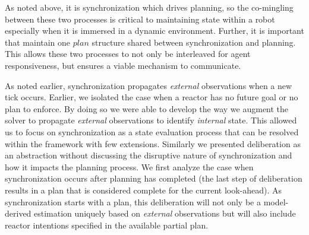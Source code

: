 As noted above, it is synchronization which drives planning, so the
co-mingling between these two processes is critical to maintaining
state within a robot especially when it is immersed in a dynamic
environment. Further, it is important that \rx maintain
one $plan$ structure shared between synchronization and planning. This
allows these two processes to not only be interleaved for agent
responsiveness, but ensures a viable mechanism to communicate.


As noted earlier, synchronization propagates {\em
  external} observations when a new tick occurs. Earlier, we isolated
the case when a reactor has no future goal or no plan to enforce. By
doing so we were able to develop the way we augment the \eu solver to
propagate {\em external} observations to identify {\em
  internal} state. This allowed us to focus on synchronization as a
state evaluation process that can be resolved within the \eu framework
with few extensions. Similarly we presented deliberation as an
abstraction without discussing the disruptive nature of
synchronization and how it impacts the planning process. We first
analyze the case when synchronization occurs after planning has
completed (\ie the last step of deliberation results in a plan that is
considered complete for the current look-ahead). As synchronization
starts with a plan, this deliberation will not only be a model-derived
estimation uniquely based on {\em external} observations but will also
include reactor intentions specified in the available partial plan.

